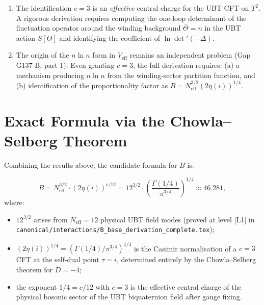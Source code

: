 \documentclass[12pt,a4paper]{article}
\theoremstyle{definition}
\theoremstyle{remark}
\begin{document}
\begin{enumerate}
  \item The identification $c = 3$ is an \emph{effective} central charge for
        the UBT CFT on $T^2$.  A rigorous derivation requires computing the
        one-loop determinant of the fluctuation operator around the winding
        background $\bar\Theta = n$ in the UBT action $S[\Theta]$ and identifying
        the coefficient of $\ln\det'(-\Delta)$.

  \item The origin of the $n\ln n$ form in $V_{\mathrm{eff}}$ remains an
        independent problem (Gap G137-B, part 1).  Even granting $c = 3$,
        the full derivation requires: (a) a mechanism producing $n\ln n$
        from the winding-sector partition function, and (b) identification of
        the proportionality factor as $B = N_{\mathrm{eff}}^{3/2}(2\eta(i))^{1/4}$.
\end{enumerate}

\section{Exact Formula via the Chowla--Selberg Theorem}
\label{sec:cs:exact}

Combining the results above, the candidate formula for $B$ is:

\begin{equation}
  \boxed{
  B = N_{\mathrm{eff}}^{3/2} \cdot (2\eta(i))^{c/12}
    = 12^{3/2} \cdot \left(\frac{\Gamma(1/4)}{\pi^{3/4}}\right)^{1/4}
    \approx 46.281,
  }
  \label{eq:cs:Bfinal}
\end{equation}
where:
\begin{itemize}
  \item $12^{3/2}$ arises from $N_{\mathrm{eff}} = 12$ physical UBT field modes
        (proved at level [L1] in \texttt{canonical/interactions/B\_base\_derivation\_complete.tex});
  \item $(2\eta(i))^{1/4} = (\Gamma(1/4)/\pi^{3/4})^{1/4}$ is the Casimir
        normalisation of a $c=3$ CFT at the self-dual point $\tau = i$,
        determined entirely by the Chowla--Selberg theorem for $D = -4$;
  \item the exponent $1/4 = c/12$ with $c = 3$ is the effective central
        charge of the physical bosonic sector of the UBT biquaternion field
        after gauge fixing.
\end{itemize}
\end{document}
